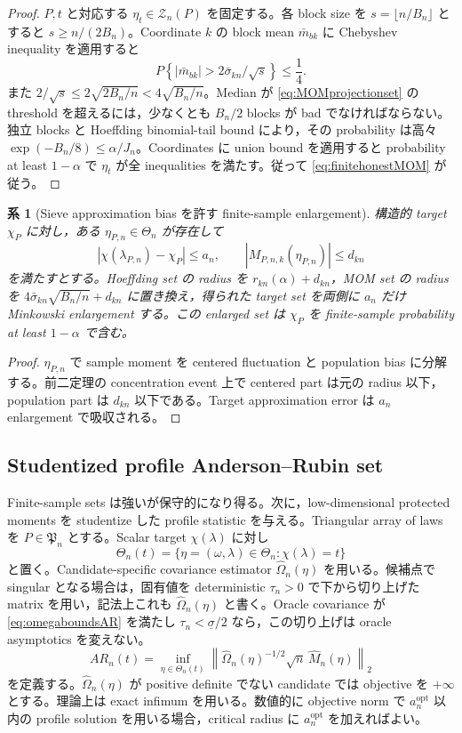 \documentclass[11pt,a4paper]{ltjsarticle}
\newtheorem{corollary}{系}[section]
\theoremstyle{remark}
\newcommand{\wh}{\widehat}
\newcommand{\abs}[1]{\left|#1\right|}
\newcommand{\cZ}{\mathcal Z}
\begin{document}
\begin{proof}
$P,t$ と対応する $\eta_t\in\cZ_n(P)$ を固定する。各 block size を $s=\lfloor n/B_n\rfloor$ とすると $s\ge n/(2B_n)$。Coordinate $k$ の block mean $\bar m_{bk}$ に Chebyshev inequality を適用すると
\[
P\left\{\abs{\bar m_{bk}}>2\bar\sigma_{kn}/\sqrt s\right\}
\le\frac14.
\]
また $2/\sqrt s\le2\sqrt{2B_n/n}<4\sqrt{B_n/n}$。Median が \eqref{eq:MOMprojectionset} の threshold を超えるには，少なくとも $B_n/2$ blocks が bad でなければならない。独立 blocks と Hoeffding binomial-tail bound により，その probability は高々 $\exp(-B_n/8)\le\alpha/J_n$。Coordinates に union bound を適用すると probability at least $1-\alpha$ で $\eta_t$ が全 inequalities を満たす。従って \eqref{eq:finitehonestMOM} が従う。
\end{proof}

\begin{corollary}[Sieve approximation bias を許す finite-sample enlargement]\label{cor:finitebiasenlarge}
構造的 target $\chi_P$ に対し，ある $\eta_{P,n}\in\Theta_n$ が存在して
\[
\abs{\chi(\lambda_{P,n})-\chi_P}\le a_n,
\qquad
\abs{M_{P,n,k}(\eta_{P,n})}\le d_{kn}
\]
を満たすとする。Hoeffding set の radius を $r_{kn}(\alpha)+d_{kn}$，MOM set の radius を $4\bar\sigma_{kn}\sqrt{B_n/n}+d_{kn}$ に置き換え，得られた target set を両側に $a_n$ だけ Minkowski enlargement する。この enlarged set は $\chi_P$ を finite-sample probability at least $1-\alpha$ で含む。
\end{corollary}

\begin{proof}
$\eta_{P,n}$ で sample moment を centered fluctuation と population bias に分解する。前二定理の concentration event 上で centered part は元の radius 以下，population part は $d_{kn}$ 以下である。Target approximation error は $a_n$ enlargement で吸収される。
\end{proof}

\subsection{Studentized profile Anderson--Rubin set}
Finite-sample sets は強いが保守的になり得る。次に，low-dimensional protected moments を studentize した profile statistic を与える。Triangular array of laws を $P\in\mathfrak P_n$ とする。Scalar target $\chi(\lambda)$ に対し
\[
\Theta_n(t)=\{\eta=(\omega,\lambda)\in\Theta_n:\chi(\lambda)=t\}
\]
と置く。Candidate-specific covariance estimator $\wh\Omega_n(\eta)$ を用いる。候補点で singular となる場合は，固有値を deterministic $\tau_n>0$ で下から切り上げた matrix を用い，記法上これも $\wh\Omega_n(\eta)$ と書く。Oracle covariance が \eqref{eq:omegaboundsAR} を満たし $\tau_n<\underline\sigma/2$ なら，この切り上げは oracle asymptotics を変えない。
\begin{equation}
AR_n(t)
=\inf_{\eta\in\Theta_n(t)}
\left\|
\wh\Omega_n(\eta)^{-1/2}\sqrt n\,\wh M_n(\eta)
\right\|_2
\label{eq:ARprofile}
\end{equation}
を定義する。$\wh\Omega_n(\eta)$ が positive definite でない candidate では objective を $+\infty$ とする。理論上は exact infimum を用いる。数値的に objective norm で $a_n^{\mathrm{opt}}$ 以内の profile solution を用いる場合，critical radius に $a_n^{\mathrm{opt}}$ を加えればよい。
\end{document}
